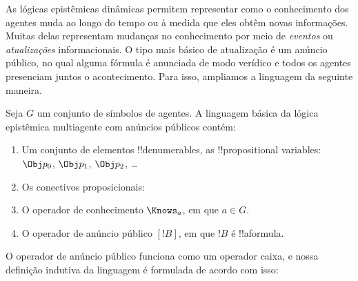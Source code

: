 \documentclass[../../../include/open-logic-section]{subfiles}
\begin{document}


As lógicas epistêmicas dinâmicas permitem representar como o
conhecimento dos agentes muda ao longo do tempo ou à medida que eles
obtêm novas informações. Muitas delas representam mudanças no
conhecimento por meio de \emph{eventos} ou \emph{atualizações}
informacionais. O tipo mais básico de atualização é um anúncio público,
no qual alguma fórmula é anunciada de modo verídico e todos os agentes
presenciam juntos o acontecimento. Para isso, ampliamos a linguagem da
seguinte maneira.

\begin{defn}
Seja $G$ um conjunto de símbolos de agentes. A linguagem básica da
lógica epistêmica multiagente com anúncios públicos contém:
\begin{enumerate}
  \item Um conjunto de elementos !!{denumerable}s, as !!{propositional variable}s: $\Obj
    p_0$, $\Obj p_1$, $\Obj p_2$, \dots
  \item Os conectivos proposicionais: \startycommalist
  \item O operador de conhecimento $\Knows_a$, em que $a \in G$.
  \item O operador de anúncio público $[!B]$, em que $!B$ é !!a{formula}.
\end{enumerate}
\end{defn}

O operador de anúncio público funciona como um operador caixa, e nossa
definição indutiva da linguagem é formulada de acordo com isso:
\end{document}
